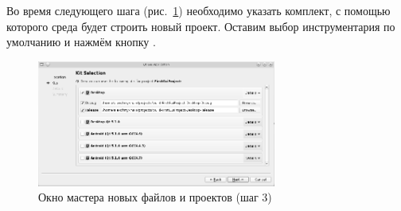 Во время следующего шага (рис.~\ref{ch11:refDrawing4}) необходимо указать
комплект, с помощью которого среда будет строить новый проект. Оставим выбор
инструментария по умолчанию и нажмём кнопку .

\begin{figure}[htb]
\begin{center}
\includegraphics[width=0.7\textwidth]{img/ris_11_5}
\caption{Окно мастера новых файлов и проектов (шаг 3)}
\label{ch11:refDrawing4}
\end{center}
\end{figure}

